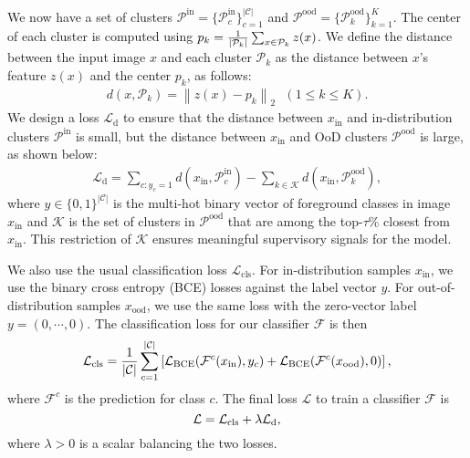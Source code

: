 \documentclass[10pt,twocolumn,letterpaper]{article}
\begin{document}
We now have a set of clusters $\mathcal{P}^\text{in}=\{\mathcal{P}^\text{in}_c\}_{c=1}^{|\mathcal{C}|}$ and $\mathcal{P}^\text{ood}=\{\mathcal{P}^\text{ood}_k\}_{k=1}^{K}$.
The center of each cluster is computed using $p_k = {1 \over |\mathcal{P}_k|} \sum_{x \in \mathcal{P}_k} z(x)$.
We define the distance between the input image $x$ and each cluster $\mathcal{P}_k$ as the distance between $x$'s feature $z(x)$ and the center $p_k$, as follows:
\begin{align}\label{distance}
d(x, \mathcal{P}_k) = \left\lVert z(x) - p_k \right\rVert_2 ~~~ (1\leq k \leq K).
\end{align}
We design a loss $\mathcal{L}_\text{d}$ to ensure that the distance between $x_\text{in}$ and in-distribution clusters $\mathcal{P}^\text{in}$ is small, but the distance between $x_\text{in}$ and OoD clusters $\mathcal{P}^\text{ood}$ is large, as shown below:
\begin{align}\label{distance}
\mathcal{L}_\text{d} = \sum_{c: y_c=1} d(x_\text{in}, \mathcal{P}_c^\text{in}) - \sum_{k \in \mathcal{K}} d(x_\text{in}, \mathcal{P}_k^\text{ood}),
\end{align}
where $y\in\{0,1\}^{|\mathcal{C}|}$ is the multi-hot binary vector of foreground classes in image $x_\text{in}$ and $\mathcal{K}$ is the set of clusters in $\mathcal{P}^\text{ood}$
that are among the top-$\tau \%$ closest from  $x_\text{in}$. This restriction of $\mathcal{K}$ ensures meaningful supervisory signals for the model.






We also use the usual classification loss $\mathcal{L}_\text{cls}$. For in-distribution samples $x_\text{in}$, we use the binary cross entropy (BCE) losses against the label vector $y$. For out-of-distribution samples $x_\text{ood}$, we use the same loss with the zero-vector label $y=(0,\cdots,0)$.
The classification loss for our classifier $\mathcal{F}$ is then
\begin{equation}
    \mathcal{L}_\text{cls} =
    \frac{1}{|\mathcal{C}|}
    \sum_{c=1}^{|\mathcal{C}|}
    \left[
    \mathcal{L}_\text{BCE}(\mathcal{F}^c(x_\text{in}), y_c) + \mathcal{L}_\text{BCE}(\mathcal{F}^c(x_\text{ood}), 0)
    \right],
    \vspace{-0.15em}
\end{equation}
where $\mathcal{F}^c$ is the prediction for class $c$.
The final loss $\mathcal{L}$ to train a classifier $\mathcal{F}$ is
\begin{equation}\label{total_loss}
\vspace{-0.5em}
\mathcal{L} = \mathcal{L}_\text{cls} + \lambda \mathcal{L}_\text{d},
\vspace{-0.00em}
\end{equation}
where $\lambda>0$ is a scalar balancing the two losses.
\end{document}
